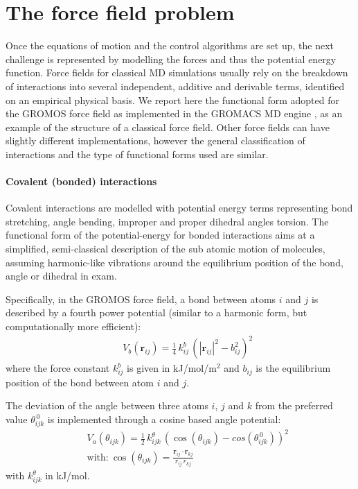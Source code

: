 \section{The force field problem} \label{sec:ff}

Once the equations of motion and the control algorithms are set up, the next challenge is represented by modelling the forces and thus the potential energy function.
%
Force fields for classical MD simulations usually rely on the breakdown of interactions into several independent, additive and derivable terms, identified on an empirical physical basis. We report here the functional form adopted for the GROMOS force field \cite{Oostenbrink2004,Schmid2011} as implemented in the GROMACS MD engine \cite{Berendsen1995,Abraham2015,gromacs_man}, as an example of the structure of a classical force field.
%
Other force fields can have slightly different implementations, however the general classification of interactions and the type of functional forms used are similar.

\paragraph{Covalent (bonded) interactions} Covalent interactions are modelled with potential energy terms representing bond stretching, angle bending, improper and proper dihedral angles torsion.
%
The functional form of the potential-energy for bonded interactions aims at a simplified, semi-classical description of the sub atomic motion of molecules, assuming harmonic-like vibrations around the equilibrium position of the bond, angle or dihedral in exam.

Specifically, in the GROMOS force field, a bond between atoms $i$ and $j$ is described by a fourth power potential (similar to a harmonic form, but computationally more efficient):
\begin{eqnarray}
&& V_b(\textbf{r}_{ij}) = \frac{1}{4}\,k^b_{ij}\,\left(|\textbf{r}_{ij}|^2 - b_{ij}^2\right)^2
\end{eqnarray}
where the force constant $k^b_{ij}$ is given in kJ/mol/m$^2$ and $b_{ij}$ is the equilibrium position of the bond between atom $i$ and $j$.

The deviation of the angle between three atoms $i$, $j$ and $k$ from the preferred value $\theta^{\, 0}_{ijk}$ is implemented through a cosine based angle potential:
\begin{eqnarray}
&& V_a(\theta_{ijk}) = \frac{1}{2}\,k^\theta_{ijk}\,\left(\cos\left(\theta_{ijk}\right) - cos\left(\theta^{\, 0}_{ijk}\right)\right)^2 \\
&& \text{with:} \ \cos\left(\theta_{ijk}\right) = \frac{\textbf{r}_{ij}\cdot \textbf{r}_{kj}}{r_{ij}\,r_{kj}}
\end{eqnarray}
with $k^\theta_{ijk}$ in kJ/mol.

